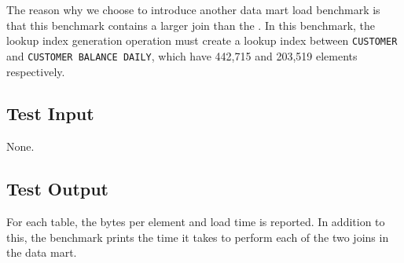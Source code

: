 The reason why we choose to introduce another data mart load benchmark is that this benchmark contains a larger join than the \tpchdl. In this benchmark, the lookup index generation operation must create a lookup index between \texttt{CUSTOMER} and \texttt{CUSTOMER BALANCE DAILY}, which have 442,715 and 203,519 elements respectively.

\subsection{Test Input}
\label{sub:Test Input}
None.

\subsection{Test Output}
\label{sub:Test Output}
For each table, the bytes per element and load time is reported. In addition to this, the benchmark prints the time it takes to perform each of the two joins in the data mart.

%
%
%
%
%
%
%


